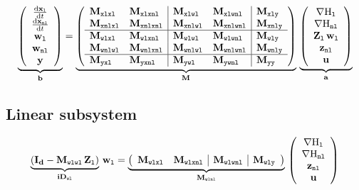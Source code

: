 \documentclass[10pt,a4paper]{article}
\begin{document}
\begin{equation}
\underbrace{\left(\begin{array}{c}
\D{\vxl}{t}\\
\D{\vxnl}{t}\\
\vwl\\
\vwnl\\
\vy
\end{array}\right)}_{\vec b}
 = \underbrace{\left(\begin{array}{ll|ll|l}
\M{xlxl}&\M{xlxnl}&\M{xlwl} & \M{xlwnl} & \M{xly}\\ 
\M{xnlxl}&\M{xnlxnl}&\M{xnlwl} &  \M{xnlwnl} & \M{xnly}\\ \hline
\M{wlxl}& \M{wlxnl}& \M{wlwl} & \M{wlwnl} & \M{wly}\\
\M{wnlwl}& \M{wnlxnl}& \M{wnlwl} & \M{wnlwnl} & \M{wnly}\\ \hline
\M{yxl} &\M{yxnl}&\M{ywl} & \M{ywnl} &\M{yy}
\end{array}\right)}_{\M{}}
\,
\underbrace{\left(\begin{array}{c}
\nabla\Hl\\
\nabla\Hnl\\
\mat{Z}_{\lab l}\,\vwl\\
\vznl\\
\vu
\end{array}\right) }_{\vec a}
\end{equation}
%
\subsection{Linear subsystem}
%
\begin{equation}
\underbrace{\left( \Id-\M{wlwl} \,\mat{Z}_{\lab l}\right)}_{\mat{iD}_{\lab {wl}}}
\,
\vwl
 = \underbrace{\left(\begin{array}{ l l | l | l }
\M{wlxl}& \M{wlxnl}&  \M{wlwnl} & \M{wly}
\end{array}\right)}_{\M{wlnl}}
\,
\left(\begin{array}{c}
\nabla\Hl\\
\nabla\Hnl\\
\vznl\\
\vu
\end{array}\right) 
\end{equation}
%
\end{document}
